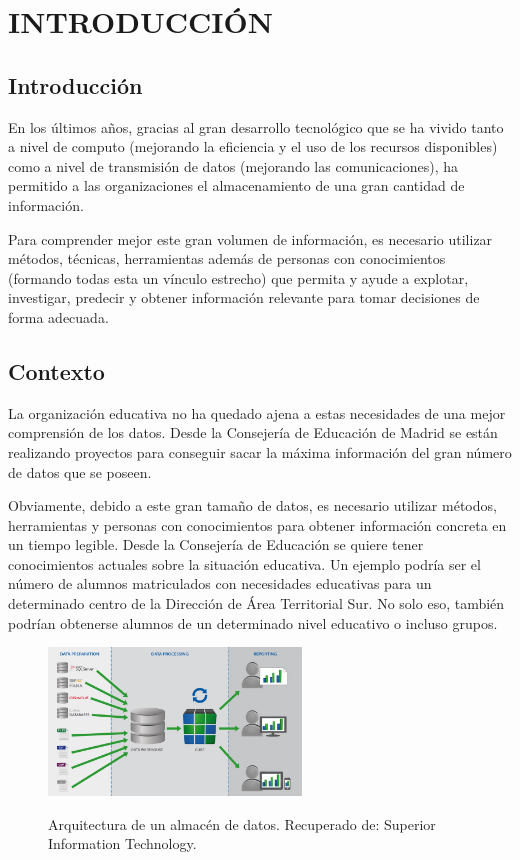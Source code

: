 \section{INTRODUCCIÓN}
\subsection{Introducción}
En los últimos años, gracias al gran desarrollo tecnológico que se ha vivido tanto a nivel de computo (mejorando la eficiencia y el uso de los recursos disponibles) como a nivel de transmisión de datos (mejorando las comunicaciones), ha permitido a las organizaciones el almacenamiento de una gran cantidad de información.

Para comprender mejor este gran volumen de información, es necesario utilizar métodos, técnicas, herramientas además de personas con conocimientos (formando todas esta un vínculo estrecho) que permita y ayude a explotar, investigar, predecir y obtener información relevante para tomar decisiones de forma adecuada.

\subsection{Contexto}
La organización educativa no ha quedado ajena a estas necesidades de una mejor comprensión de los datos. Desde la Consejería de Educación de Madrid se están realizando proyectos para conseguir sacar la máxima información del gran número de datos que se poseen.

Obviamente, debido a este gran tamaño de datos, es necesario utilizar métodos, herramientas y personas con conocimientos para obtener información concreta en un tiempo legible. Desde la Consejería de Educación se quiere tener conocimientos actuales sobre la situación educativa. Un ejemplo podría ser el número de alumnos matriculados con necesidades educativas para un determinado centro de la Dirección de Área Territorial Sur. No solo eso, también podrían obtenerse alumnos de un determinado nivel educativo o incluso grupos.

\begin{figure}[htb]
	\centering
	\caption{
		Arquitectura de un almacén de datos. Recuperado de: Superior Information Technology.
	}
	\includegraphics[width=0.6\textwidth]{recursos/arquitecturaDatawarehouse}
	\label{fig:ArqDWH}
\end{figure}


